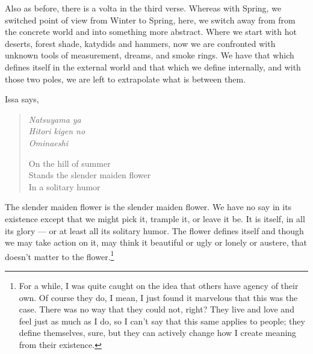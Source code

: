 \documentclass[12pt,oneside]{memoir}
\begin{document}
Also as before, there is a volta in the third verse. Whereas with Spring, we switched point of view from Winter to Spring, here, we switch away from from the concrete world and into something more abstract. Where we start with hot deserts, forest shade, katydids and hammers, now we are confronted with unknown tools of measurement, dreams, and smoke rings. We have that which defines itself in the external world and that which we define internally, and with those two poles, we are left to extrapolate what is between them.

Issa says,

\begin{verse}
\emph{Natsuyama ya} \\
\emph{Hitori kigen no} \\
\emph{Ominaeshi}

On the hill of summer \\
Stands the slender maiden flower \\
In a solitary humor

\parencite[65]{issa}
\end{verse}

The slender maiden flower is the slender maiden flower. We have no say in its existence except that we might pick it, trample it, or leave it be. It is itself, in all its glory --- or at least all its solitary humor. The flower defines itself and though we may take action on it, may think it beautiful or ugly or lonely or austere, that doesn't matter to the flower.\footnote{For a while, I was quite caught on the idea that others have agency of their own. Of course they do, I mean, I just found it marvelous that this was the case. There was no way that they could not, right? They live and love and feel just as much as I do, so I can't say that this same applies to people; they define themselves, sure, but they can actively change how I create meaning from their existence.\footnotemark}
\end{document}
